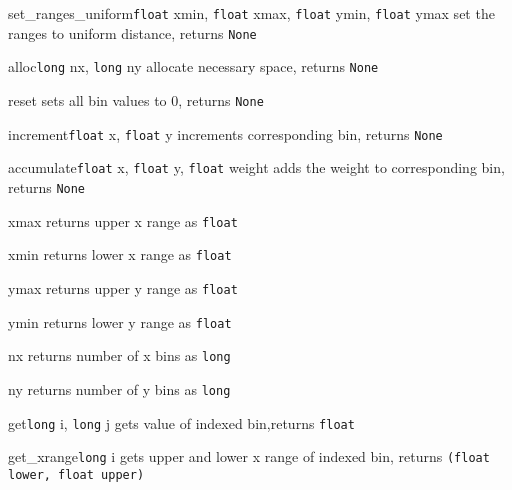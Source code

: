 \begin{methoddesc}{set_ranges_uniform}{\texttt{float} xmin, \texttt{float} xmax,
                                       \texttt{float} ymin, \texttt{float} ymax}
set the ranges to uniform distance, \hfill returns \texttt{None}
\end{methoddesc}
\begin{methoddesc}{alloc}{\texttt{long} nx, \texttt{long} ny}
allocate necessary space, \hfill returns \texttt{None}
\end{methoddesc}
\begin{methoddesc}{reset}{}
sets all bin values to 0, \hfill returns \texttt{None}
\end{methoddesc}
\begin{methoddesc}{increment}{\texttt{float} x, \texttt{float} y}
increments corresponding bin, \hfill returns \texttt{None}
\end{methoddesc}
\begin{methoddesc}{accumulate}{\texttt{float} x, \texttt{float} y,
                               \texttt{float} weight}
adds the weight to corresponding bin, \hfill returns \texttt{None}
\end{methoddesc}
\begin{methoddesc}{xmax}{}
returns upper x range \hfill as \texttt{float}
\end{methoddesc}
\begin{methoddesc}{xmin}{}
returns lower x range \hfill as \texttt{float}
\end{methoddesc}
\begin{methoddesc}{ymax}{}
returns upper y range \hfill as \texttt{float}
\end{methoddesc}
\begin{methoddesc}{ymin}{}
returns lower y range \hfill as \texttt{float}
\end{methoddesc}
\begin{methoddesc}{nx}{}
returns number of x bins \hfill as \texttt{long}
\end{methoddesc}
\begin{methoddesc}{ny}{}
returns number of y bins \hfill as \texttt{long}
\end{methoddesc}
\begin{methoddesc}{get}{\texttt{long} i, \texttt{long} j}
gets value of indexed bin,\hfill returns \texttt{float}
\end{methoddesc}
\begin{methoddesc}{get_xrange}{\texttt{long} i}
gets upper and lower x range of indexed bin,
\hfill returns \texttt{(float \textrm{lower}, float \textrm{upper})}
\end{methoddesc}
